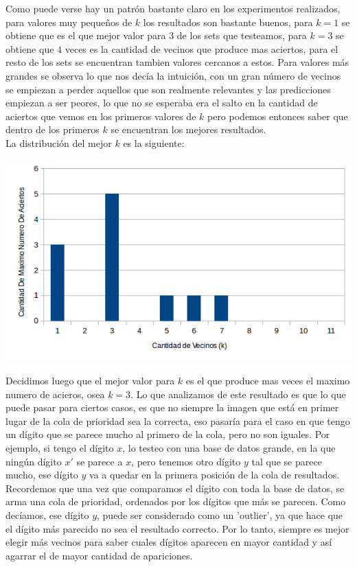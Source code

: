 Como puede verse hay un patrón bastante claro en los experimentos realizados, para valores muy pequeños de $k$ los resultados son bastante buenos, para $k=1$ se obtiene que es el que mejor valor para $3$ de los sets que testeamos, para $k=3$ se obtiene que $4$ veces es la cantidad de vecinos que produce mas aciertos, para el resto de los sets se encuentran tambien valores cercanos a estos. Para valores más grandes se observa lo que nos decía la intuición, con un gran número de vecinos se empiezan a perder aquellos que son realmente relevantes y las predicciones empiezan a ser peores, lo que no se esperaba era el salto en la cantidad de aciertos que vemos en los primeros valores de $k$ pero podemos entonces saber que dentro de los primeros $k$ se encuentran los mejores resultados.
\\
La distribución del mejor $k$ es la siguiente:
\begin{center}
\includegraphics[scale=0.55]{nuevosResultados/knn/max.png}
\end{center}
Decidimos luego que el mejor valor para $k$ es el que produce mas veces el maximo numero de acieros, osea $k=3$. Lo que analizamos de este resultado es que lo que puede pasar para ciertos casos, es que no siempre la imagen que está en primer lugar de la cola de prioridad sea la correcta, eso pasaría para el caso en que tengo un dígito que se parece mucho al primero de la cola, pero no son iguales.
Por ejemplo, si tengo el dígito $x$, lo testeo con una base de datos grande, en la que ningún dígito $x'$ se parece a $x$, pero tenemos otro dígito $y$ tal que se parece mucho, ese dígito $y$ va a quedar en la primera posición de la cola de resultados.
Recordemos que una vez que comparamos el dígito con toda la base de datos, se arma una cola de prioridad, ordenados por los dígitos que más se parecen.
Como decíamos, ese dígito $y$, puede ser considerado como un 'outlier', ya que hace que el dígito más parecido no sea el resultado correcto. Por lo tanto, siempre es mejor elegir más vecinos para saber cuales dígitos aparecen en mayor cantidad y así agarrar el de mayor cantidad de apariciones.
